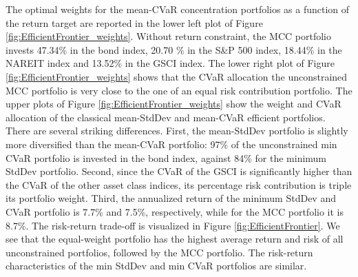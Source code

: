 \documentclass[12pt,a4paper]{article}
\begin{document}
The optimal weights for the mean-CVaR concentration portfolios as a function of the return target are reported in the lower left plot of Figure \ref{fig:EfficientFrontier_weights}. Without return constraint, the MCC portfolio invests 47.34\% in the bond index, 20.70 \% in the S\&P 500 index, 18.44\% in the NAREIT index and 13.52\% in the GSCI index. The lower right plot of Figure \ref{fig:EfficientFrontier_weights} shows that the CVaR allocation the unconstrained MCC portfolio is very close to the one of an equal risk contribution portfolio. The upper plots of Figure \ref{fig:EfficientFrontier_weights} show the weight and CVaR allocation of the classical mean-StdDev and mean-CVaR efficient portfolios. There are several striking differences. First, the mean-StdDev portfolio is slightly more diversified than the mean-CVaR portfolio: 97\% of the unconstrained min CVaR portfolio is invested in the bond index, against 84\% for the minimum StdDev portfolio. Second, since the CVaR of the GSCI is significantly higher than the CVaR of the other asset class indices, its percentage risk contribution is triple its portfolio weight.
Third, the annualized return of the minimum StdDev and CVaR portfolio is 7.7\% and 7.5\%, respectively, while for the MCC portfolio it is 8.7\%.
The risk-return trade-off is visualized in Figure \ref{fig:EfficientFrontier}. We see that the equal-weight portfolio has the highest average return and risk of all unconstrained portfolios, followed by the MCC portfolio. The risk-return characteristics of the min StdDev and min CVaR portfolios are similar.
\end{document}
